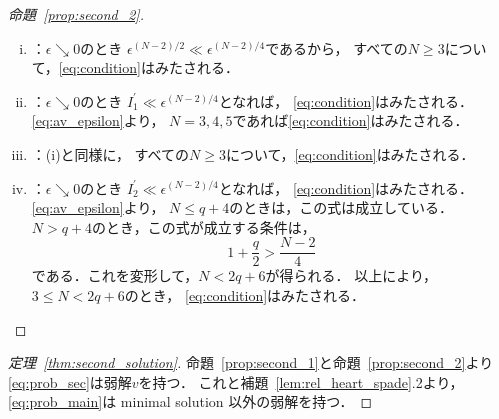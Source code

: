 \begin{proof}[命題~\ref{prop:second_2}]
 \begin{enumerate}[(i)]
  \item {}：$\epsilon \searrow 0$のとき
        $\epsilon^{(N-2)/2} \ll \epsilon^{(N-2)/4}$であるから，
        すべての$N \geq 3$について，\eqref{eq:condition}はみたされる．
  \item {}：$\epsilon \searrow 0$のとき
        $I_1^\prime \ll \epsilon^{(N-2)/4}$となれば，
        \eqref{eq:condition}はみたされる．
        \eqref{eq:av_epsilon}より，
        $N = 3, 4, 5$であれば\eqref{eq:condition}はみたされる．
  \item {}：(i)と同様に，
        すべての$N \geq 3$について，\eqref{eq:condition}はみたされる．
  \item {}：$\epsilon \searrow 0$のとき
        $I_2^\prime \ll \epsilon^{(N-2)/4}$となれば，
        \eqref{eq:condition}はみたされる．
        \eqref{eq:av_epsilon}より，
        $N \leq q + 4$のときは，この式は成立している．
        $N > q + 4$のとき，この式が成立する条件は，
        \[
         1 + \frac{q}{2} > \frac{N-2}{4}
        \]
        である．これを変形して，$N < 2q + 6$が得られる．
        以上により，$3 \leq N < 2q + 6$のとき，
        \eqref{eq:condition}はみたされる． \qedhere
 \end{enumerate}
\end{proof}

\begin{proof}[定理~\ref{thm:second_solution}]
 命題~\ref{prop:second_1}と命題~\ref{prop:second_2}より
 \ref{eq:prob_sec}は弱解$v$を持つ．
 これと補題~\ref{lem:rel_heart_spade}.2より，\ref{eq:prob_main}は
 minimal solution 以外の弱解を持つ．
 \qedhere
\end{proof}

